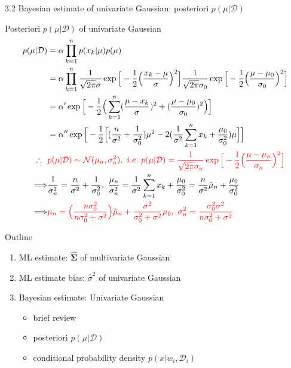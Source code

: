 \documentclass[compress,blue]{beamer}
\newcommand{\bSig}{\mathbf{\Sigma}}
\newcommand{\calD}{\mathcal{D}}
\begin{document}
\begin{frame}{3.2 Bayesian estimate of univariate Gaussian: posteriori $p(\mu|\calD)$}
	\begin{block}{Posteriori $p(\mu|\calD)$ of univariate Gaussian}
		\vspace{-0.15in}
		\tiny
		\begin{align}
			p(\mu|\calD) &= \alpha \prod_{k=1}^n p(x_k | \mu)p(\mu)\\
			&= \alpha \prod_{k=1}^n \frac{1}{\sqrt{2\pi}\sigma}\exp\Big[-\frac{1}{2}\Big(\frac{x_k-\mu}{\sigma}\Big)^2\Big]\frac{1}{\sqrt{2\pi}\sigma_0}\exp\Big[-\frac{1}{2}\Big(\frac{\mu-\mu_0}{\sigma_0}\Big)^2\Big]\\
			&=\alpha' \exp\Big[-\frac{1}{2}\Big(\sum_{k=1}^n(\frac{\mu-x_k}{\sigma})^2 + (\frac{\mu-\mu_0}{\sigma_0})^2\Big)\Big]\\
			&=\alpha'' \exp\Big[-\frac{1}{2}\Big[(\frac{n}{\sigma^2} + \frac{1}{\sigma_0^2})\mu^2 - 2(\frac{1}{\sigma^2}\sum_{k=1}^n x_k + \frac{\mu_0}{\sigma_0^2})\mu\Big]\Big] \\
		 	\therefore ~~& \textcolor{red}{p(\mu | \calD) \sim \mathcal{N}(\mu_n, \sigma_n^2), ~i.e.~ p(\mu|\calD) = \frac{1}{\sqrt{2\pi}\sigma_n} \exp\Big[-\frac{1}{2}\Big(\frac{\mu-\mu_n}{\sigma_n}\Big)^2\Big]}\\
			\Longrightarrow &\frac{1}{\sigma^2_n} = \frac{n}{\sigma^2} + \frac{1}{\sigma^2_0}, ~ \frac{\mu_n}{\sigma^2_n} = \frac{1}{\sigma^2}\sum_{k=1}^n x_k + \frac{\mu_0}{\sigma^2_0} = \frac{n}{\sigma^2}\hat{\mu}_n + \frac{\mu_0}{\sigma^2_0}\\
			\Longrightarrow & \textcolor{red}{\mu_n = \Big(\frac{n\sigma^2_0}{n\sigma^2_0 + \sigma^2}\Big)\hat{\mu}_n + \frac{\sigma^2}{\sigma^2_0+\sigma^2}\mu_0, ~ \sigma_n^2 = \frac{\sigma_0^2\sigma^2}{n\sigma^2_0 + \sigma^2}}
		\end{align}
		\normalsize
	\end{block}
\end{frame}

\begin{frame}{Outline}
	\begin{enumerate}
		\item<1-> ML estimate: $\hat{\bSig}$ of multivariate Gaussian 
		\vspace{0.1in}
		\item<1-> ML estimate bias: $\hat{\sigma}^2$ of univariate Gaussian
		\vspace{0.1in}
		\item<1-> Bayesian estimate: Univariate Gaussian
		\begin{itemize}
			\item<1-> brief review
			\item<1-> posteriori $p(\mu|\calD)$
			\item<2-> conditional probability density $p(x | w_i, \calD_i)$
		\end{itemize}
	\end{enumerate}
\end{frame}
\end{document}
